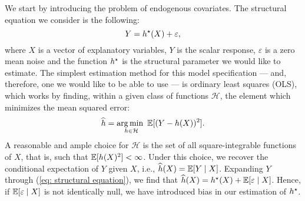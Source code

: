 We start by introducing the problem of endogenous covariates.
The structural equation we consider is the following:
\begin{equation}
    \label{eq: structural equation}
    Y = h^{ \star } ( X ) + \varepsilon
,\end{equation}
where $ X $ is a vector of explanatory variables, $ Y $ is the scalar response, $ \varepsilon $ is a zero mean noise and the function $ h^{ \star } $ is the structural parameter we would like to estimate.
The simplest estimation method for this model specification --- and, therefore, one we would like to be able to use --- is ordinary least squares (OLS), which works by finding, within a given class of functions $ \mathcal{H} $, the element which minimizes the mean squared error:
\begin{equation}
    \label{eq: ols estimate}
    \hat{ h } = \argmin_{ h \in \mathcal{H} } \mean [ 
        ( Y - h ( X ) )^2
    ]
.\end{equation}
A reasonable and ample choice for $ \mathcal{H} $ is the set of all square-integrable functions of $ X $, that is, such that $ \mathbb{E} [ h ( X )^2 ] < \infty $.
Under this choice, we recover the conditional expectation of $ Y $ given $ X $, i.e., $ \widehat{ h } ( X ) = \mathbb{E} [ Y \mid X ] $.
Expanding $ Y $ through (\ref{eq: structural equation}), we find that $ \widehat{ h } ( X ) = h^{ \star } ( X ) + \mathbb{E} [ \varepsilon \mid X ] $.
Hence, if $ \mathbb{E} [ \varepsilon \mid X ] $ is not identically null, we have introduced bias in our estimation of $ h^{ \star } $.

